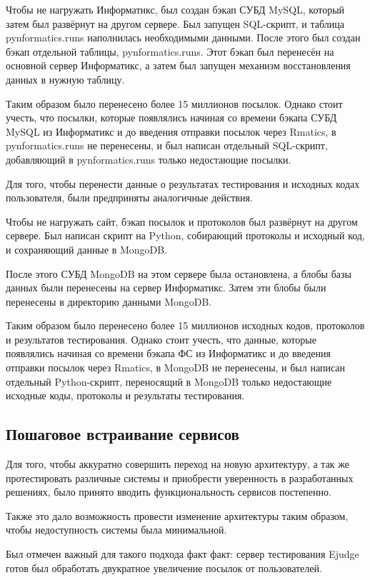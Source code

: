 Чтобы не нагружать Информатикс, был создан бэкап СУБД MySQL,
который затем был развёрнут на другом сервере. 
Был запущен SQL-скрипт, и таблица pynformatics.runs наполнилась необходимыми данными.
После этого был создан бэкап отдельной таблицы, pynformatics.runs.
Этот бэкап был перенесён на основной сервер Информатикс, а затем был запущен механизм восстановления данных в нужную таблицу.

Таким образом было перенесено более 15 миллионов посылок.
Однако стоит учесть, что посылки, которые появлялись начиная со времени бэкапа СУБД MySQL из Информатикс и до введения отправки посылок через Rmatics,
в pynformatics.runs не перенесены, и был написан отдельный SQL-скрипт,
добавляющий в pynformatics.runs только недостающие посылки.

Для того, чтобы перенести данные о результатах тестирования и исходных кодах пользователя, 
были предприняты аналогичные действия.

Чтобы не нагружать сайт, бэкап посылок и протоколов был развёрнут на другом сервере.
Был написан скрипт на Python, собирающий протоколы и исходный код, 
и сохраняющий данные в MongoDB. 

После этого СУБД MongoDB на этом сервере была остановлена, 
а блобы базы данных были перенесены на сервер Информатикс.
Затем эти блобы были перенесены в директорию данными MongoDB.

Таким образом было перенесено более 15 миллионов исходных кодов, протоколов и результатов тестирования.
Однако стоит учесть, что данные, которые появлялись начиная со времени бэкапа ФС из Информатикс и до введения отправки посылок через Rmatics,
в MongoDB не перенесены, и был написан отдельный Python-скрипт,
переносящий в MongoDB только недостающие исходные коды, протоколы и результаты тестирования.

\subsection{Пошаговое встраивание сервисов}

Для того, чтобы аккуратно совершить переход на новую архитектуру, 
а так же протестировать различные системы и приобрести уверенность в разработанных решениях, было принято вводить функциональность сервисов постепенно.

Также это дало возможность провести изменение архитектуры таким образом,
чтобы недоступность системы была минимальной.

Был отмечен важный для такого подхода факт факт: 
сервер тестирования Ejudge готов был обработать двукратное увеличение посылок от пользователей.

